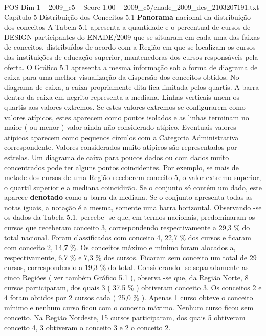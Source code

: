 \begin{textsample}{POS Dim 1 – 2009\_c5 – Score 1.00 – 2009\_c5/enade\_2009\_des\_2103207191.txt}  \label{ex:f1_pos_150}
Capítulo 5 Distribuição dos Conceitos 5.1 \textbf{Panorama} nacional da distribuição dos conceitos A Tabela 5.1 apresenta a quantidade e o percentual de cursos de DESIGN participantes do ENADE/2009 que se situaram em cada uma das faixas de conceitos, distribuídos de acordo com a Região em que se localizam os cursos das instituições de educação superior, mantenedoras dos cursos responsáveis pela oferta.
O Gráfico 5.1 apresenta a mesma informação sob a forma de diagrama de caixa para uma melhor visualização da dispersão dos conceitos obtidos.
No diagrama de caixa, a caixa propriamente dita fica limitada pelos quartis.
A barra dentro da caixa em negrito representa a mediana.
Linhas verticais unem os quartis aos valores extremos.
Se estes valores extremos se configurarem como valores atípicos, estes aparecem como pontos isolados e as linhas terminam no maior ( ou menor ) valor ainda não considerado atípico.
Eventuais valores atípicos aparecem como pequenos círculos com a Categoria Administrativa correspondente.
Valores considerados muito atípicos são representados por estrelas.
Um diagrama de caixa para poucos dados ou com dados muito concentrados pode ter alguns pontos coincidentes.
Por exemplo, se mais de metade dos cursos de uma Região receberem conceito 5, o valor extremo superior, o quartil superior e a mediana coincidirão.
Se o conjunto só contém um dado, este aparece \textbf{denotado} como a barra da mediana.
Se o conjunto apresenta todas as notas iguais, a notação é a mesma, somente uma barra horizontal.
Observando -se os dados da Tabela 5.1, percebe -se que, em termos nacionais, predominaram os cursos que receberam conceito 3, correspondendo respectivamente a 29,3 \% do total nacional.
Foram classificados com conceito 4, 22,7 \% dos cursos e ficaram com conceito 2, 14,7 \%.
Os conceitos máximo e mínimo foram alocados a, respectivamente, 6,7 \% e 7,3 \% dos cursos.
Ficaram sem conceito um total de 29 cursos, correspondendo a 19,3 \% do total.
Considerando -se separadamente as cinco Regiões ( ver também Gráfico 5.1 ), observa -se que, da Região Norte, 8 cursos participaram, dos quais 3 ( 37,5 \% ) obtiveram conceito 3.
Os conceitos 2 e 4 foram obtidos por 2 cursos cada ( 25,0 \% ).
Apenas 1 curso obteve o conceito mínimo e nenhum curso ficou com o conceito máximo.
Nenhum curso ficou sem conceito.
Na Região Nordeste, 15 cursos participaram, dos quais 5 obtiveram conceito 4, 3 obtiveram o conceito 3 e 2 o conceito 2.

\end{textsample}
